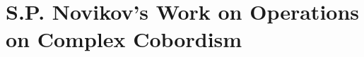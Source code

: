 \documentclass[../main]{subfiles}
\begin{document}
\part{S.P. Novikov's Work on Operations on Complex Cobordism}\label{part:p1}











\printbibliography
\end{document}
